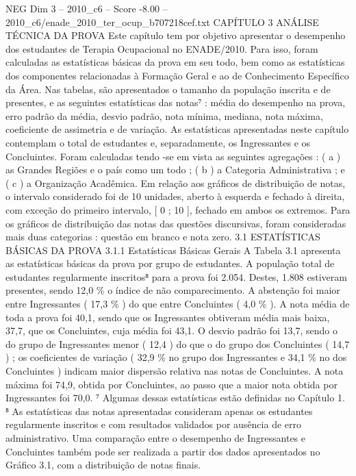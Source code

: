 \begin{textsample}{NEG Dim 3 – 2010\_c6 – Score -8.00 – 2010\_c6/enade\_2010\_ter\_ocup\_b707218cef.txt}  \label{ex:f3_neg_001}
CAPÍTULO 3 ANÁLISE TÉCNICA DA PROVA Este capítulo tem por objetivo apresentar o desempenho dos estudantes de Terapia Ocupacional no ENADE/2010.
Para isso, foram calculadas as estatísticas básicas da prova em seu todo, bem como as estatísticas dos componentes relacionadas à Formação Geral e ao de Conhecimento Específico da Área.
Nas tabelas, são apresentados o tamanho da população inscrita e de presentes, e as seguintes estatísticas das notas⁷ : média do desempenho na prova, erro padrão da média, desvio padrão, nota mínima, mediana, nota máxima, coeficiente de assimetria e de variação.
As estatísticas apresentadas neste capítulo contemplam o total de estudantes e, separadamente, os Ingressantes e os Concluintes.
Foram calculadas tendo -se em vista as seguintes agregações : ( a ) as Grandes Regiões e o país como um todo ; ( b ) a Categoria Administrativa ; e ( c ) a Organização Acadêmica.
Em relação aos gráficos de distribuição de notas, o intervalo considerado foi de 10 unidades, aberto à esquerda e fechado à direita, com exceção do primeiro intervalo, [ 0 ; 10 ], fechado em ambos os extremos.
Para os gráficos de distribuição das notas das questões discursivas, foram consideradas mais duas categorias : questão em branco e nota zero. 3.1 ESTATÍSTICAS BÁSICAS DA PROVA 3.1.1 Estatísticas Básicas Gerais A Tabela 3.1 apresenta as estatísticas básicas da prova por grupo de estudantes.
A população total de estudantes regularmente inscritos⁸ para a prova foi 2.054.
Destes, 1.808 estiveram presentes, sendo 12,0 \% o índice de não comparecimento.
A abstenção foi maior entre Ingressantes ( 17,3 \% ) do que entre Concluintes ( 4,0 \% ).
A nota média de toda a prova foi 40,1, sendo que os Ingressantes obtiveram média mais baixa, 37,7, que os Concluintes, cuja média foi 43,1.
O desvio padrão foi 13,7, sendo o do grupo de Ingressantes menor ( 12,4 ) do que o do grupo dos Concluintes ( 14,7 ) ; os coeficientes de variação ( 32,9 \% no grupo dos Ingressantes e 34,1 \% no dos Concluintes ) indicam maior dispersão relativa nas notas de Concluintes.
A nota máxima foi 74,9, obtida por Concluintes, ao passo que a maior nota obtida por Ingressantes foi 70,0. ⁷ Algumas dessas estatísticas estão definidas no Capítulo 1. ⁸ As estatísticas das notas apresentadas consideram apenas os estudantes regularmente inscritos e com resultados validados por ausência de erro administrativo.
Uma comparação entre o desempenho de Ingressantes e Concluintes também pode ser realizada a partir dos dados apresentados no Gráfico 3.1, com a distribuição de notas finais.

\end{textsample}
